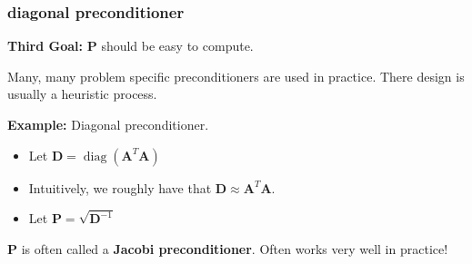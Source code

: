 \documentclass[compress]{beamer}
\newcommand{\bv}[1]{\mathbf{#1}}
\DeclareMathOperator{\diag}{diag}
\begin{document}
\begin{frame}[t]
	\frametitle{diagonal preconditioner}
	\textbf{Third Goal:} $\bv{P}$ should be easy to compute. 
	
	\begin{center}
		\alert{Many, many problem specific preconditioners are used in practice. There design is usually a heuristic process.} 
	\end{center}
	
	\textbf{Example:} Diagonal preconditioner. 
	\begin{itemize}
		\item Let $\bv{D} = \diag(\bv{A}^T\bv{A})$
		\item Intuitively, we roughly have that $\bv{D} \approx \bv{A}^T\bv{A}$. 
		\item Let $\bv{P} = \sqrt{\bv{D}^{-1}}$
	\end{itemize}
	$\bv{P}$ is often called a \alert{\textbf{Jacobi preconditioner}}. Often works very well in practice!
\end{frame}
\end{document}
